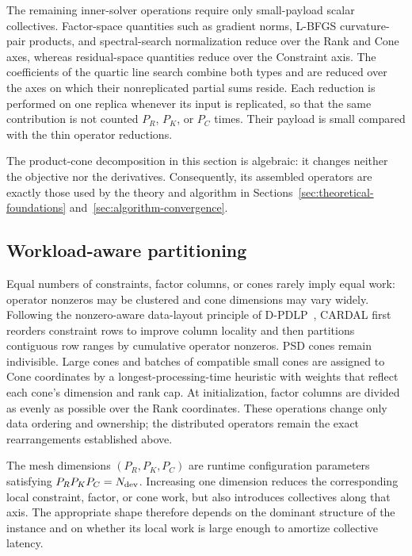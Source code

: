 \documentclass[11pt]{article}
\theoremstyle{definition}
\theoremstyle{remark}
\newcommand{\name}{\textsc{CARDAL}\xspace}
\begin{document}
The remaining inner-solver operations require only small-payload scalar
collectives.  Factor-space quantities such as gradient norms, L-BFGS
curvature-pair products, and spectral-search normalization reduce over the
Rank and Cone axes, whereas residual-space quantities reduce over the
Constraint axis.  The coefficients of the quartic line search combine both
types and are reduced over the axes on which their nonreplicated partial sums
reside.  Each reduction is performed on one replica whenever its input is
replicated, so that the same contribution is not counted $P_R$, $P_K$, or
$P_C$ times.  Their payload is small compared with the thin operator
reductions.

The product-cone decomposition in this section is algebraic: it changes
neither the objective nor the derivatives.  Consequently, its assembled
operators are exactly those used by the theory and algorithm in
Sections~\ref{sec:theoretical-foundations}
and~\ref{sec:algorithm-convergence}.

\subsection{Workload-aware partitioning}
\label{subsec:workload-aware-partitioning}

Equal numbers of constraints, factor columns, or cones rarely imply equal
work: operator nonzeros may be clustered and cone dimensions may vary
widely.  Following the nonzero-aware data-layout principle of
D-PDLP~\cite{DPDLP}, \name{} first reorders constraint rows to improve
column locality and then partitions contiguous row ranges by cumulative
operator nonzeros.  PSD cones remain indivisible.  Large cones and batches of
compatible small cones are assigned to Cone coordinates by a
longest-processing-time heuristic with weights that reflect each cone's
dimension and rank cap.  At initialization, factor columns are divided as
evenly as possible over the Rank coordinates.  These operations change only
data ordering and ownership; the distributed operators remain the exact
rearrangements established above.

The mesh dimensions $(P_R,P_K,P_C)$ are runtime configuration parameters
satisfying $P_RP_KP_C=N_{\rm dev}$.  Increasing one dimension reduces the
corresponding local constraint, factor, or cone work, but also introduces
collectives along that axis.  The appropriate shape therefore depends on the
dominant structure of the instance and on whether its local work is large
enough to amortize collective latency.
\end{document}
